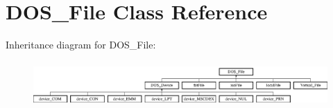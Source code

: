 \hypertarget{classDOS__File}{\section{D\-O\-S\-\_\-\-File Class Reference}
\label{classDOS__File}
}
Inheritance diagram for D\-O\-S\-\_\-\-File\-:\begin{figure}[H]
\begin{center}
\leavevmode
\includegraphics[height=1.764706cm]{classDOS__File}
\end{center}
\end{figure}

